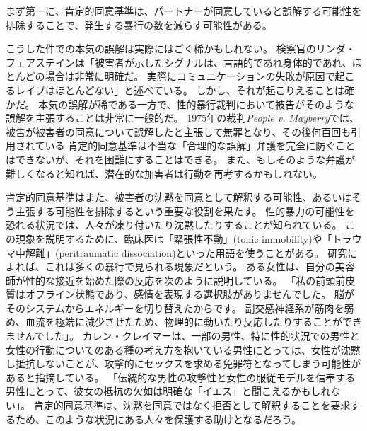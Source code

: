 \documentclass[paper=a4,book,openany]{jlreq}
\newcommand{\ig}[1]{}           %
\begin{document}
まず第一に、肯定的同意基準は、パートナーが同意していると誤解する可能性を排除することで、発生する暴行の数を減らす可能性がある。

こうした件での本気の誤解は実際にはごく稀かもしれない。
検察官のリンダ・フェアステイン\ig{Linda Fairstein}は「被害者が示したシグナルは、言語的であれ身体的であれ、ほとんどの場合は非常に明確だ。
実際にコミュニケーションの失敗が原因で起こるレイプはほとんどない」と述べている\citep{fairstein94:_panel_discus_men_women_rape}。
しかし、それが起こりえることは確かだ。
本気の誤解が稀である一方で、性的暴行裁判において被告がそのような誤解を主張することは非常に一般的だ。
1975年の裁判\emph{People v. Mayberry}では、被告が被害者の同意について誤解したと主張して無罪となり、その後何百回も引用されている
肯定的同意基準は不当な「合理的な誤解」弁護を完全に防ぐことはできないが、それを困難にすることはできる。
また、もしそのような弁護が難しくなると知れば、潜在的な加害者は行動を再考するかもしれない。

肯定的同意基準はまた、被害者の沈黙を同意として解釈する可能性、あるいはそう主張する可能性を排除するという重要な役割を果たす。
性的暴力の可能性を恐れる状況では、人々が凍り付いたり沈黙したりすることが知られている。
この現象を説明するために、臨床医は「緊張性不動」(tonic immobility)や「トラウマ中解離」(peritraumatic dissociation)といった用語を使うことがある。
研究によれば、これは多くの暴行で見られる現象だという\citep{moller17:_tonic_immob_durin_sexual_assaul}。
ある女性は、自分の美容師が性的な接近を始めた際の反応を次のように説明している。
「私の前頭前皮質はオフライン状態であり、感情を表現する選択肢がありませんでした。
脳がそのシステムからエネルギーを切り替えたからです。
副交感神経系が筋肉を弱め、血流を極端に減少させたため、物理的に動いたり反応したりすることができませんでした」\citep{corvo18:_why_i_froze_smiled_durin}。
カレン・クレイマー\ig{Karen Kramer}は、一部の男性、特に性的状況での男性と女性の行動についてのある種の考え方を抱いている男性にとっては、女性が沈黙し抵抗しないことが、攻撃的にセックスを求める免罪符となってしまう可能性があると指摘している。
「伝統的な男性の攻撃性と女性の服従モデルを信奉する男性にとって、彼女の抵抗の欠如は明確な「イエス」と聞こえるかもしれない」\citep[p.121]{kramer94:_rule_myth}。
肯定的同意基準は、沈黙を同意ではなく拒否として解釈することを要求するため、このような状況にある人々を保護する助けとなるだろう。
\end{document}
